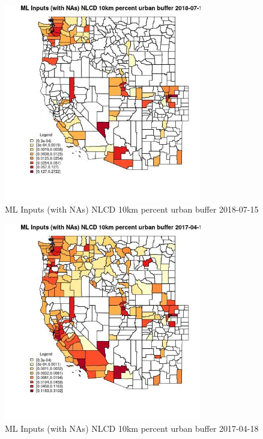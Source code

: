 \clearpage 

\begin{figure} 
\centering  
\includegraphics[width=0.77\textwidth]{Code_Outputs/Report_ML_input_PM25_Step4_part_e_de_duplicated_aves_compiled_2019-05-21wNAs_CountyNLCD_10km_percent_urban_bufferMean2018-07-15.jpg} 
\caption{\label{fig:Report_ML_input_PM25_Step4_part_e_de_duplicated_aves_compiled_2019-05-21wNAsCountyNLCD_10km_percent_urban_bufferMean2018-07-15}ML Inputs (with NAs) NLCD 10km percent urban buffer 2018-07-15} 
\end{figure} 
 

\begin{figure} 
\centering  
\includegraphics[width=0.77\textwidth]{Code_Outputs/Report_ML_input_PM25_Step4_part_e_de_duplicated_aves_compiled_2019-05-21wNAs_CountyNLCD_10km_percent_urban_bufferMean2017-04-18.jpg} 
\caption{\label{fig:Report_ML_input_PM25_Step4_part_e_de_duplicated_aves_compiled_2019-05-21wNAsCountyNLCD_10km_percent_urban_bufferMean2017-04-18}ML Inputs (with NAs) NLCD 10km percent urban buffer 2017-04-18} 
\end{figure} 
 

